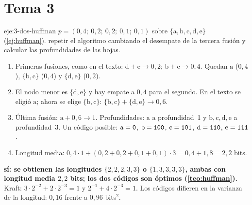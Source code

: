 \section{Tema 3}

\begin{solucion}{eje:3-dos-huffman}
\datos $p=(0{,}4;\ 0{,}2;\ 0{,}2;\ 0{,}1;\ 0{,}1)$ sobre $\{\mathrm{a},\mathrm{b},\mathrm{c},\mathrm{d},\mathrm{e}\}$ (\cref{ej:huffman}).
\planteamiento repetir el algoritmo cambiando el desempate de la tercera fusión y calcular las profundidades de las hojas.
\pasos
\begin{enumerate}[label=\arabic*.]
  \item Primeras fusiones, como en el texto: $\mathrm{d}+\mathrm{e}\to 0{,}2$; $\mathrm{b}+\mathrm{c}\to 0{,}4$. Quedan $\mathrm{a}$ ($0{,}4$), $\{\mathrm{b},\mathrm{c}\}$ ($0{,}4$) y $\{\mathrm{d},\mathrm{e}\}$ ($0{,}2$).
  \item El nodo menor es $\{\mathrm{d},\mathrm{e}\}$ y hay empate a $0{,}4$ para el segundo. En el texto se eligió $\mathrm{a}$; ahora se elige $\{\mathrm{b},\mathrm{c}\}$: $\{\mathrm{b},\mathrm{c}\}+\{\mathrm{d},\mathrm{e}\}\to 0{,}6$.
  \item Última fusión: $\mathrm{a}+0{,}6\to 1$. Profundidades: $\mathrm{a}$ a profundidad~1 y $\mathrm{b},\mathrm{c},\mathrm{d},\mathrm{e}$ a profundidad~3. Un código posible: $\mathrm{a}=\textnormal{\texttt{0}}$, $\mathrm{b}=\textnormal{\texttt{100}}$, $\mathrm{c}=\textnormal{\texttt{101}}$, $\mathrm{d}=\textnormal{\texttt{110}}$, $\mathrm{e}=\textnormal{\texttt{111}}$.
  \item Longitud media: $0{,}4\cdot 1+(0{,}2+0{,}2+0{,}1+0{,}1)\cdot 3=0{,}4+1{,}8=2{,}2$ bits.
\end{enumerate}
\resultado \textbf{sí: se obtienen las longitudes $\{2,2,2,3,3\}$ o $\{1,3,3,3,3\}$, ambas con longitud media $2{,}2$ bits; los dos códigos son óptimos (\cref{teo:huffman}).}
\comprobacion Kraft: $3\cdot2^{-2}+2\cdot2^{-3}=1$ y $2^{-1}+4\cdot2^{-3}=1$. Los códigos difieren en la varianza de la longitud: $0{,}16$ frente a $0{,}96$ bits$^{2}$.
\end{solucion}


